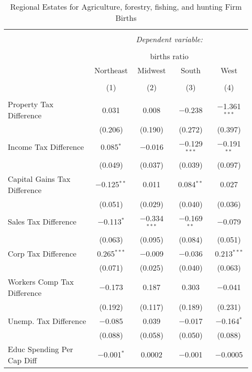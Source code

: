 
\begin{table}[!htbp] \centering 
  \caption{Regional Estates for  Agriculture, forestry, fishing, and hunting Firm Births} 
  \label{} 
\begin{tabular}{@{\extracolsep{5pt}}lcccc} 
\\[-1.8ex]\hline 
\hline \\[-1.8ex] 
 & \multicolumn{4}{c}{\textit{Dependent variable:}} \\ 
\cline{2-5} 
\\[-1.8ex] & \multicolumn{4}{c}{births ratio} \\ 
 & Northeast & Midwest & South & West \\ 
\\[-1.8ex] & (1) & (2) & (3) & (4)\\ 
\hline \\[-1.8ex] 
 Property Tax Difference & 0.031 & 0.008 & $-$0.238 & $-$1.361$^{***}$ \\ 
  & (0.206) & (0.190) & (0.272) & (0.397) \\ 
  Income Tax Difference & 0.085$^{*}$ & $-$0.016 & $-$0.129$^{***}$ & $-$0.191$^{**}$ \\ 
  & (0.049) & (0.037) & (0.039) & (0.097) \\ 
  Capital Gains Tax Difference & $-$0.125$^{**}$ & 0.011 & 0.084$^{**}$ & 0.027 \\ 
  & (0.051) & (0.029) & (0.040) & (0.036) \\ 
  Sales Tax Difference & $-$0.113$^{*}$ & $-$0.334$^{***}$ & $-$0.169$^{**}$ & $-$0.079 \\ 
  & (0.063) & (0.095) & (0.084) & (0.051) \\ 
  Corp Tax Difference & 0.265$^{***}$ & $-$0.009 & $-$0.036 & 0.213$^{***}$ \\ 
  & (0.071) & (0.025) & (0.040) & (0.063) \\ 
  Workers Comp Tax Difference & $-$0.173 & 0.187 & 0.303 & $-$0.041 \\ 
  & (0.192) & (0.117) & (0.189) & (0.231) \\ 
  Unemp. Tax Difference & $-$0.085 & 0.039 & $-$0.017 & $-$0.164$^{*}$ \\ 
  & (0.088) & (0.058) & (0.050) & (0.088) \\ 
  Educ Spending Per Cap Diff & $-$0.001$^{*}$ & 0.0002 & $-$0.001 & $-$0.0005 \\ 

\end{tabular}
\end{table}
